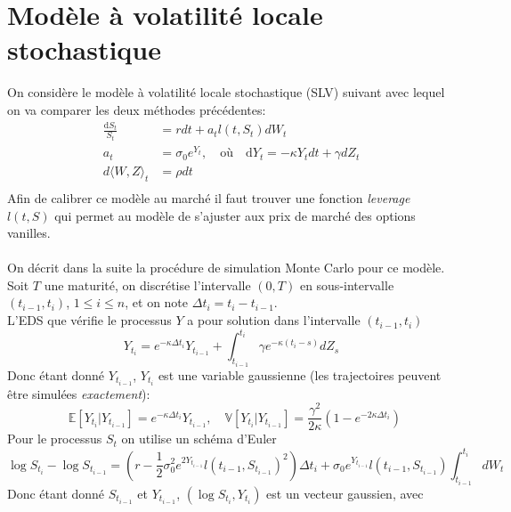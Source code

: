 \documentclass[a4paper,12pt]{report}
\numberwithin{equation}{section}
\theoremstyle{definition}
\newcommand*\E{\mathop{}\!\mathbb{E}}
\numberwithin{equation}{section}
\begin{document}
\section{Modèle à volatilité locale stochastique}
\label{slv}
On considère le modèle à volatilité locale stochastique (SLV) suivant avec lequel on va comparer les deux méthodes précédentes: 
\begin{equation}
\label{lev}
\begin{split}
\frac{\mbox{d}S_t}{S_t} &= r dt+a_tl(t,S_t)dW_t\\
a_t & =\sigma_0e^{Y_t}, \quad \mbox{où}\quad \mbox{d}Y_t=-\kappa Y_t dt+\gamma dZ_t\\
d\langle W, Z\rangle_t & =\rho dt\\
\end{split}
\end{equation}
Afin de calibrer ce modèle au marché il faut trouver une fonction \textit{leverage} $l(t,S)$ qui permet au modèle de s'ajuster aux prix de marché des options vanilles.\\\\ On décrit dans la suite la procédure de simulation Monte Carlo pour ce modèle. Soit $T$ une maturité, on discrétise l'intervalle $(0,T)$ en sous-intervalle $(t_{i-1}, t_i)$, $1 \leq i \leq n$, et on note $\Delta t_i=t_i-t_{i-1}$.\\
L'EDS que vérifie le processus $Y$ a pour solution dans l'intervalle $(t_{i-1}, t_i)$
\begin{equation}
Y_{t_i}=e^{-\kappa \Delta t_i}Y_{t_{i-1}}+\displaystyle \int_{t_{i-1}}^{t_i}\gamma e^{-\kappa (t_i -s)}dZ_s
\end{equation} 
Donc étant donné $Y_{t_{i-1}}$, $Y_{t_i}$ est une variable gaussienne (les trajectoires peuvent être simulées \textit{exactement}): 
$$\E[Y_{t_i}|Y_{t_{i-1}}]=e^{-\kappa \Delta t_i}Y_{t_{i-1}}, \quad \mathbb{V} [Y_{t_i}|Y_{t_{i-1}}]=\frac{\gamma^2}{2\kappa}\displaystyle \left( 1 - e^{-2\kappa \Delta t_i} \right)$$
Pour le processus $S_t$ on utilise un schéma d'Euler
\begin{equation}
\log S_{t_i} - \log S_{t_{i-1}}= \left(r - \frac{1}{2} \sigma_0^2 e^{2Y_{t_{i-1}}}l(t_{i-1},S_{t_{i-1}})^2\right)\Delta t_i+ \sigma_0 e^{Y_{t_{i-1}}}l(t_{i-1},S_{t_{i-1}}) \int_{t_{i-1}}^{t_i} dW_t
\end{equation}
Donc étant donné $S_{t_{i-1}}$ et $Y_{t_{i-1}}$, $\left( \log S_{t_i}, Y_{t_i}\right)$ est un vecteur gaussien, avec
\end{document}
